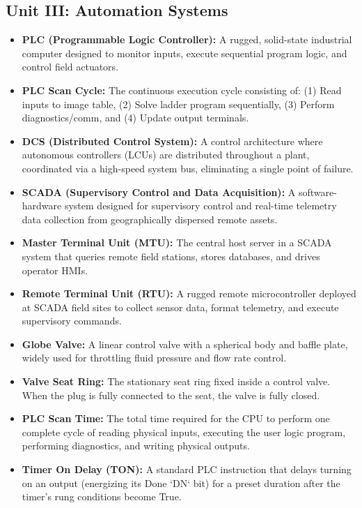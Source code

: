 \subsection{Unit III: Automation Systems}
\begin{itemize}
  \item \textbf{PLC (Programmable Logic Controller):} A rugged, solid-state industrial computer designed to monitor inputs, execute sequential program logic, and control field actuators.
  \item \textbf{PLC Scan Cycle:} The continuous execution cycle consisting of: (1) Read inputs to image table, (2) Solve ladder program sequentially, (3) Perform diagnostics/comm, and (4) Update output terminals.
  \item \textbf{DCS (Distributed Control System):} A control architecture where autonomous controllers (LCUs) are distributed throughout a plant, coordinated via a high-speed system bus, eliminating a single point of failure.
  \item \textbf{SCADA (Supervisory Control and Data Acquisition):} A software-hardware system designed for supervisory control and real-time telemetry data collection from geographically dispersed remote assets.
  \item \textbf{Master Terminal Unit (MTU):} The central host server in a SCADA system that queries remote field stations, stores databases, and drives operator HMIs.
  \item \textbf{Remote Terminal Unit (RTU):} A rugged remote microcontroller deployed at SCADA field sites to collect sensor data, format telemetry, and execute supervisory commands.
  \item \textbf{Globe Valve:} A linear control valve with a spherical body and baffle plate, widely used for throttling fluid pressure and flow rate control.
  \item \textbf{Valve Seat Ring:} The stationary seat ring fixed inside a control valve. When the plug is fully connected to the seat, the valve is fully closed.
  \item \textbf{PLC Scan Time:} The total time required for the CPU to perform one complete cycle of reading physical inputs, executing the user logic program, performing diagnostics, and writing physical outputs.
  \item \textbf{Timer On Delay (TON):} A standard PLC instruction that delays turning on an output (energizing its Done `DN` bit) for a preset duration after the timer's rung conditions become True.
\end{itemize}

